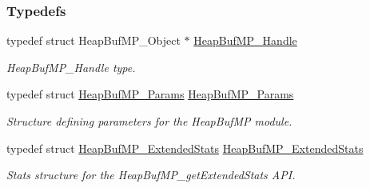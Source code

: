 \subsubsection*{Typedefs}
\begin{DoxyCompactItemize}
\item 
typedef struct HeapBufMP\_\-Object $\ast$ \hyperlink{_heap_buf_m_p_8h_a0dc02cca2abd71fa48bfaf79c1c09ca3}{HeapBufMP\_\-Handle}
\begin{DoxyCompactList}\small\item\em HeapBufMP\_\-Handle type. \item\end{DoxyCompactList}\item 
typedef struct \hyperlink{struct_heap_buf_m_p___params}{HeapBufMP\_\-Params} \hyperlink{_heap_buf_m_p_8h_ada60a6b6a4bee75403768e41d07525ff}{HeapBufMP\_\-Params}
\begin{DoxyCompactList}\small\item\em Structure defining parameters for the HeapBufMP module. \item\end{DoxyCompactList}\item 
typedef struct \hyperlink{struct_heap_buf_m_p___extended_stats}{HeapBufMP\_\-ExtendedStats} \hyperlink{_heap_buf_m_p_8h_a0a9972756cf113da0ac5f2eb7f647fbe}{HeapBufMP\_\-ExtendedStats}
\begin{DoxyCompactList}\small\item\em Stats structure for the HeapBufMP\_\-getExtendedStats API. \item\end{DoxyCompactList}\end{DoxyCompactItemize}
